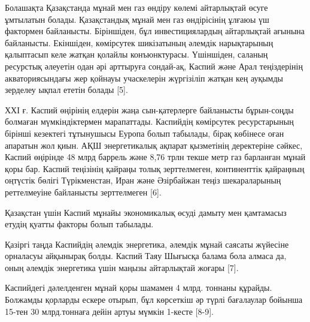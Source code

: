\begin{multicols}{2}
Болашақта Қазақстанда мұнай мен газ өндіру көлемі айтарлықтай өсуге
ұмтылатын болады. Қазақстандық мұнай мен газ өндірісінің ұлғаюы үш
фактормен байланысты. Біріншіден, бұл инвестициялардың айтарлықтай
ағынына байланысты. Екіншіден, көмірсутек шикізатының әлемдік
нарықтарының қалыптасып келе жатқан қолайлы конъюнктурасы. Үшіншіден,
саланың ресурстық әлеуетін одан әрі арттыруға сондай-ақ, Каспий және
Арал теңіздерінің акваториясындағы жер қойнауы учаскелерін жүргізіліп
жатқан кең ауқымды зерделеу ықпал ететін болады {[}5{]}.

ХХІ ғ. Каспий өңірінің елдерін жаңа сын-қатерлерге байланысты
бұрын-соңды болмаған мүмкіндіктермен марапаттады. Каспийдің көмірсутек
ресурстарының бірінші кезектегі тұтынушысы Еуропа болып табылады, бірақ
көбінесе оған апаратын жол қиын. АҚШ энергетикалық ақпарат қызметінің
деректеріне сәйкес, Каспий өңірінде 48 млрд баррель және 8,76 трлн текше
метр газ барланған мұнай қоры бар. Каспий теңізінің қайраңы толық
зерттелмеген, континенттік қайраңның оңтүстік бөлігі Түрікменстан, Иран
және Әзірбайжан теңіз шекараларының реттелмеуіне байланысты зерттелмеген
{[}6{]}.

Қазақстан үшін Каспий мұнайы экономикалық өсуді дамыту мен қамтамасыз
етудің қуатты факторы болып табылады.

Қазіргі таңда Каспийдің әлемдік энергетика, әлемдік мұнай саясаты
жүйесіне орналасуы айқынырақ болды. Каспий Таяу Шығысқа балама бола
алмаса да, оның әлемдік энергетика үшін маңызы айтарлықтай жоғары
{[}7{]}.

Каспийдегі дәлелденген мұнай қоры шамамен 4 млрд. тоннаны құрайды.
Болжамды қорларды ескере отырып, бұл көрсеткіш әр түрлі бағалаулар
бойынша 15-тен 30 млрд.тоннаға дейін артуы мүмкін 1-кесте {[}8-9{]}.

\end{multicols}


